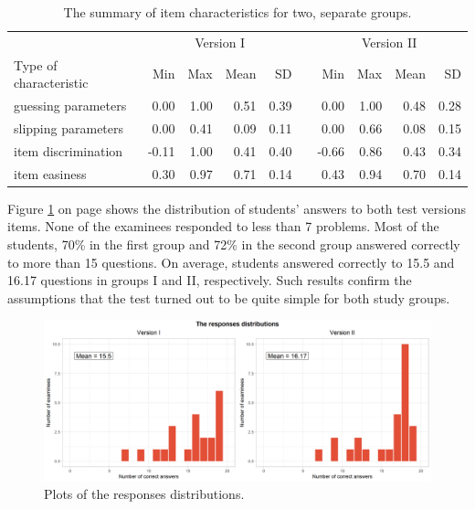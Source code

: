 \documentclass[english]{pwr_wmat_praca_dyplomowa}
\theoremstyle{plain}
\numberwithin{theorem}{chapter}
\theoremstyle{definition}
\numberwithin{theorem}{chapter}
\begin{document}
	\begin{table}[H]
		\centering
		\begin{tabular}{l r r r r c r r r r} 
			\hline
			{\rule{0pt}{3ex}} & \multicolumn{4}{c}{Version I} & & \multicolumn{4}{c}{Version II} \\
			Type of characteristic & Min & Max & Mean & SD &  & Min & Max & Mean & SD \\
			\hline
			{\rule{0pt}{3ex}}guessing parameters  & 0.00 & 1.00 & 0.51 & 0.39 &  & 0.00 & 1.00 & 0.48 & 0.28 \\
			slipping parameters & 0.00 & 0.41 & 0.09 & 0.11 &  & 0.00 & 0.66 & 0.08 & 0.15 \\ 
			item discrimination & -0.11 & 1.00 & 0.41 & 0.40 &  & -0.66 & 0.86 & 0.43 & 0.34 \\ 
			item easiness & 0.30 & 0.97 & 0.71 & 0.14 &  & 0.43 & 0.94 & 0.70 & 0.14\\ [0.5ex] 
			\hline
		\end{tabular}
		\caption{The summary of item characteristics for two, separate groups.}
		\label{tab:item_param_gr} 
	\end{table}
	
	Figure \ref{histogram_ans_groups} on page \pageref{histogram_ans_groups} shows the distribution of students' answers to both test versions items. None of the examinees responded to less than 7 problems. Most of the students, 70\% in the first group and 72\% in the second group answered correctly to more than 15 questions. On average, students answered correctly to 15.5 and 16.17 questions in groups I and II, respectively. Such results confirm the assumptions that the test turned out to be quite simple for both study groups.
	
	\begin{figure}[ht]
		\centering
		\includegraphics[width=\textwidth]{Responses_distributions.png}
		\caption{Plots of the responses distributions.}
		\label{histogram_ans_groups}
	\end{figure}
	
\end{document}
